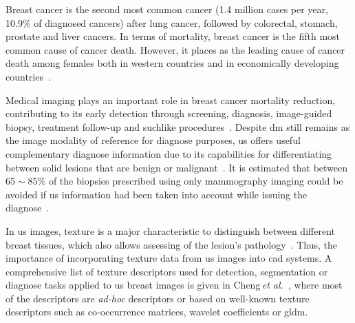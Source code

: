 \documentclass[a4paper, 10pt, conference]{llncs}      %
\begin{document}
Breast cancer is the second most common cancer (1.4 million cases per year, 10.9\% of  diagnosed cancers) after lung cancer, followed by colorectal, stomach, prostate and liver cancers. 
In terms of mortality, breast cancer is the fifth most common cause of cancer death. However, it places as the leading cause of cancer death among females both in western countries and in economically developing countries~\cite{cancerStatistics2011}.

Medical imaging plays an important role in breast cancer mortality reduction, contributing to its early detection through screening, diagnosis, image-guided biopsy, treatment follow-up and suchlike procedures~\cite{smith2003american}.
Despite \ac{dm} still remains as the image modality of reference for diagnose purposes, \ac{us} offers useful complementary  diagnose information due to its capabilities for differentiating between solid lesions that are benign or malignant~\cite{stavros2004breast}. It is estimated that between $65\sim85\%$ of the biopsies prescribed using only mammography imaging could be avoided if \ac{us} information had been taken into account while issuing the diagnose~\cite{yuan2010multimodality}. 



In \ac{us} images, texture is a major characteristic to distinguish between different breast tissues, which also allows assessing of the lesion's pathology~\cite{stavros2004breast}.  Thus, the importance of incorporating texture data from  \ac{us} images into \ac{cad} systems. A comprehensive list of texture descriptors used for detection, segmentation or diagnose tasks applied to \ac{us} breast images is given in Cheng\,\emph{et al.}~\cite{Cheng:2009p10580}, where most of the descriptors are \emph{ad-hoc} descriptors or based on well-known texture descriptors such as co-occurrence matrices, wavelet coefficients or \ac{gldm}.
\end{document}
